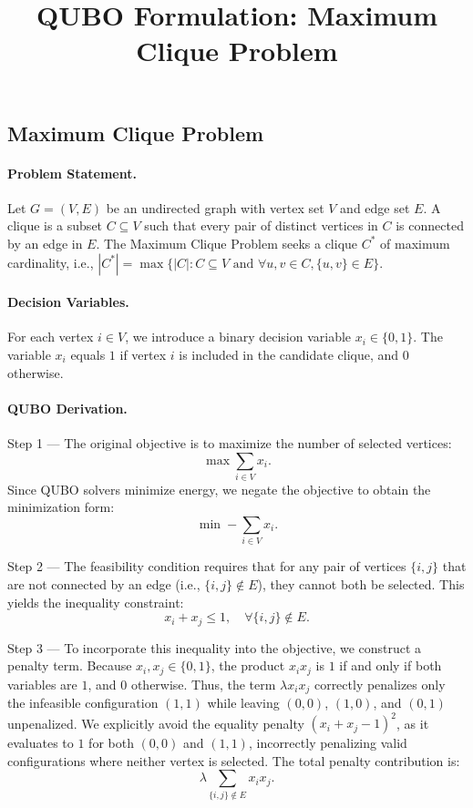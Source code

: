 \documentclass[12pt]{article}
\title{QUBO Formulation: Maximum Clique Problem}
\date{}
\begin{document}
\maketitle

\subsection*{Maximum Clique Problem}

\paragraph{Problem Statement.}
Let $G = (V, E)$ be an undirected graph with vertex set $V$ and edge set $E$. A clique is a subset $C \subseteq V$ such that every pair of distinct vertices in $C$ is connected by an edge in $E$. The Maximum Clique Problem seeks a clique $C^*$ of maximum cardinality, i.e., $|C^*| = \max \{ |C| : C \subseteq V \text{ and } \forall u,v \in C, \{u,v\} \in E \}$.

\paragraph{Decision Variables.}
For each vertex $i \in V$, we introduce a binary decision variable $x_i \in \{0,1\}$. The variable $x_i$ equals $1$ if vertex $i$ is included in the candidate clique, and $0$ otherwise.

\paragraph{QUBO Derivation.}
Step 1 --- The original objective is to maximize the number of selected vertices:
\begin{equation}
    \max \sum_{i \in V} x_i.
\end{equation}
Since QUBO solvers minimize energy, we negate the objective to obtain the minimization form:
\begin{equation}
    \min -\sum_{i \in V} x_i.
\end{equation}

Step 2 --- The feasibility condition requires that for any pair of vertices $\{i,j\}$ that are not connected by an edge (i.e., $\{i,j\} \notin E$), they cannot both be selected. This yields the inequality constraint:
\begin{equation}
    x_i + x_j \le 1, \quad \forall \{i,j\} \notin E.
\end{equation}

Step 3 --- To incorporate this inequality into the objective, we construct a penalty term. Because $x_i, x_j \in \{0,1\}$, the product $x_i x_j$ is $1$ if and only if both variables are $1$, and $0$ otherwise. Thus, the term $\lambda x_i x_j$ correctly penalizes only the infeasible configuration $(1,1)$ while leaving $(0,0)$, $(1,0)$, and $(0,1)$ unpenalized. We explicitly avoid the equality penalty $(x_i + x_j - 1)^2$, as it evaluates to $1$ for both $(0,0)$ and $(1,1)$, incorrectly penalizing valid configurations where neither vertex is selected. The total penalty contribution is:
\begin{equation}
    \lambda \sum_{\{i,j\} \notin E} x_i x_j.
\end{equation}
\end{document}
